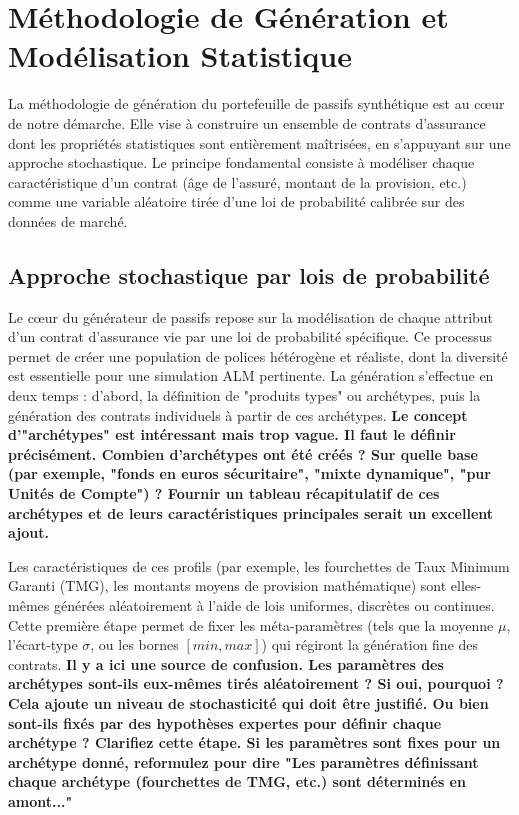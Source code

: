 \section{Méthodologie de Génération et Modélisation Statistique}

La méthodologie de génération du portefeuille de passifs synthétique est au cœur de notre démarche. Elle vise à construire un ensemble de contrats d'assurance dont les propriétés statistiques sont entièrement maîtrisées, en s'appuyant sur une approche stochastique. Le principe fondamental consiste à modéliser chaque caractéristique d'un contrat (âge de l'assuré, montant de la provision, etc.) comme une variable aléatoire tirée d'une loi de probabilité calibrée sur des données de marché.


\subsection{Approche stochastique par lois de probabilité}

Le cœur du générateur de passifs repose sur la modélisation de chaque attribut d'un contrat d'assurance vie par une loi de probabilité spécifique. Ce processus permet de créer une population de polices hétérogène et réaliste, dont la diversité est essentielle pour une simulation ALM pertinente. La génération s'effectue en deux temps : d'abord, la définition de "produits types" ou archétypes, puis la génération des contrats individuels à partir de ces archétypes. \textbf{Le concept d'"archétypes" est intéressant mais trop vague. Il faut le définir précisément. Combien d'archétypes ont été créés ? Sur quelle base (par exemple, "fonds en euros sécuritaire", "mixte dynamique", "pur Unités de Compte") ? Fournir un tableau récapitulatif de ces archétypes et de leurs caractéristiques principales serait un excellent ajout.}

Les caractéristiques de ces profils (par exemple, les fourchettes de Taux Minimum Garanti (TMG), les montants moyens de provision mathématique) sont elles-mêmes générées aléatoirement à l'aide de lois uniformes, discrètes ou continues. Cette première étape permet de fixer les méta-paramètres (tels que la moyenne $\mu$, l'écart-type $\sigma$, ou les bornes $[min, max]$) qui régiront la génération fine des contrats. \textbf{Il y a ici une source de confusion. Les paramètres des archétypes sont-ils eux-mêmes tirés aléatoirement ? Si oui, pourquoi ? Cela ajoute un niveau de stochasticité qui doit être justifié. Ou bien sont-ils fixés par des hypothèses expertes pour définir chaque archétype ? Clarifiez cette étape. Si les paramètres sont fixes pour un archétype donné, reformulez pour dire "Les paramètres définissant chaque archétype (fourchettes de TMG, etc.) sont déterminés en amont..."}

